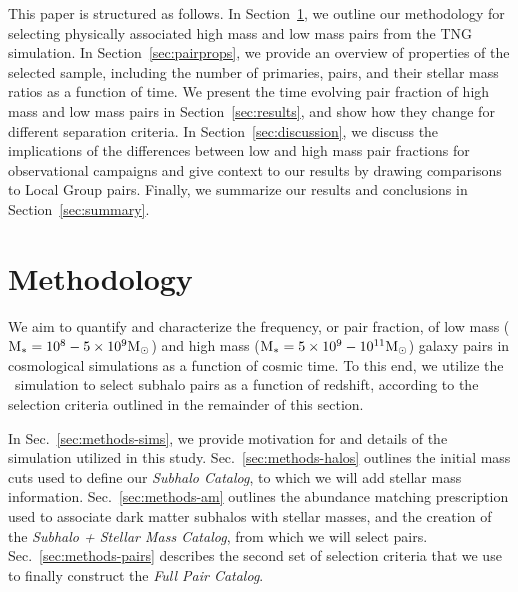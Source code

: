 \documentclass[twocolumn]{aastex631}
\newcommand{\ms}[1]{\ensuremath{M_{*{#1}}}}
\newcommand{\subcat}{\textit{Subhalo Catalog}}
\newcommand{\starcat}{\textit{Subhalo + Stellar Mass Catalog}}
\newcommand{\paircat}{\textit{Full Pair Catalog}}
\begin{document}
    This paper is structured as follows. 
    In Section~\ref{sec:methods}, we outline our methodology for selecting physically associated high mass and low mass pairs from the TNG simulation. 
    In Section~\ref{sec:pairprops}, we provide an overview of properties of the selected sample, including the number of primaries, pairs, and their stellar mass ratios as a function of time. 
    We present the time evolving pair fraction of high mass and low mass pairs in Section~\ref{sec:results}, and show how they change for different separation criteria. 
    In Section~\ref{sec:discussion}, we discuss the implications of the differences between low and high mass pair fractions for observational campaigns and give context to our results by drawing comparisons to Local Group pairs. 
    Finally, we summarize our results and conclusions in Section~\ref{sec:summary}.

 
\section{Methodology}\label{sec:methods}
We aim to quantify and characterize the frequency, or pair fraction, of low mass ($\rm\ms{}=10^{8}-5\times 10^{9}\Msun$) and high mass ($\rm\ms{}=5\times10^{9}-10^{11}\Msun$) galaxy pairs in cosmological simulations as a function of cosmic time. 
To this end, we utilize the \tng\ simulation to select subhalo pairs as a function of redshift, according to the selection criteria outlined in the remainder of this section. 

In Sec.~\ref{sec:methods-sims}, we provide motivation for and details of the simulation utilized in this study.
Sec.~\ref{sec:methods-halos} outlines the initial mass cuts used to define our \subcat, to which we will add stellar mass information. 
Sec.~\ref{sec:methods-am} outlines the abundance matching prescription used to associate dark matter subhalos with stellar masses, and the creation of the \starcat, from which we will select pairs.
Sec.~\ref{sec:methods-pairs} describes the second set of selection criteria that we use to finally construct the \paircat. 

\end{document}
